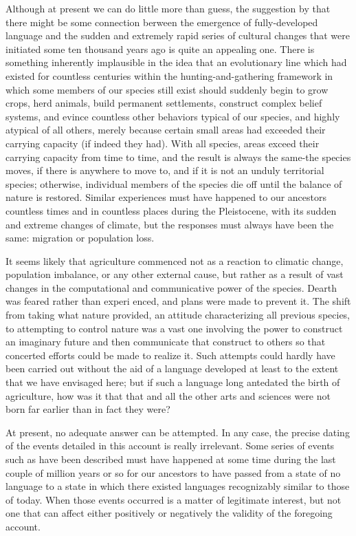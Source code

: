 Although at present we can do little more than guess, the sugges\-tion by \citet{Hockett1973} that there might be some connection berween the emergence of fully-developed language and the sudden and ex\-tremely rapid series of cultural changes that were initiated some ten thousand years ago is quite an appealing one. There is something inherently implausible in the idea that an evolutionary line which had existed for countless centuries within the hunting-and-gathering frame\-work in which some members of our species still exist should suddenly begin to grow crops, herd animals, build permanent settlements, con\-struct complex belief systems, and evince countless other behaviors typical of our species, and highly atypical of all others, merely because certain small areas had exceeded their carrying capacity (if indeed they had). With all species, areas exceed their carrying capacity from time to time, and the result is always the same-the species moves, if there is anywhere to move to, and if it is not an unduly territorial species; otherwise, individual members of the species die off until the balance of nature is restored. Similar experiences must have happened to our ancestors countless times and in countless places during the Pleistocene, with its sudden and extreme changes of climate, but the responses must always have been the same: migration or population loss.

It seems likely that agriculture commenced not as a reaction to climatic change, population imbalance, or any other external cause, but rather as a result of vast changes in the computational and com\-municative power of the species. Dearth was feared rather than experi%
enced, and plans were made to prevent it. The shift from taking what nature provided, an attitude characterizing all previous species, to attempting to control nature was a vast one involving the power to construct an imaginary future and then communicate that construct to others so that concerted efforts could be made to realize it. Such attempts could hardly have been carried out without the aid of a language developed at least to the extent that we have envisaged here; but if such a language long antedated the birth of agriculture, how was it that that and all the other arts and sciences were not born far earlier than in fact they were?

At present, no adequate answer can be attempted. In any case, the precise dating of the events detailed in this account is really irrele\-vant. Some series of events such as have been described must have happened at some time during the last couple of million years or so for our ancestors to have passed from a state of no language to a state in which there existed languages recognizably similar to those of today. When those events occurred is a matter of legitimate interest, but not one that can affect either positively or negatively the validity of the foregoing account.

